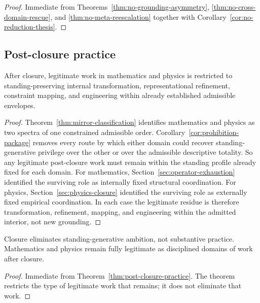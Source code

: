 \begin{proof}
Immediate from Theorems~\ref{thm:no-grounding-asymmetry}, \ref{thm:no-cross-domain-rescue}, and \ref{thm:no-meta-reescalation} together with Corollary~\ref{cor:no-reduction-thesis}.
\end{proof}

\subsection{Post-closure practice}

\begin{theorem}
\label{thm:post-closure-practice}
After closure, legitimate work in mathematics and physics is restricted to standing-preserving internal transformation, representational refinement, constraint mapping, and engineering within already established admissible envelopes.
\end{theorem}

\begin{proof}
Theorem~\ref{thm:mirror-classification} identifies mathematics and physics as two spectra of one constrained admissible order. Corollary~\ref{cor:prohibition-package} removes every route by which either domain could recover standing-generative privilege over the other or over the admissible descriptive totality. So any legitimate post-closure work must remain within the standing profile already fixed for each domain. For mathematics, Section~\ref{sec:operator-exhaustion} identified the surviving role as internally fixed structural coordination. For physics, Section~\ref{sec:physics-closure} identified the surviving role as externally fixed empirical coordination. In each case the legitimate residue is therefore transformation, refinement, mapping, and engineering within the admitted interior, not new grounding.
\end{proof}

\begin{corollary}
\label{cor:not-nihilism}
Closure eliminates standing-generative ambition, not substantive practice. Mathematics and physics remain fully legitimate as disciplined domains of work after closure.
\end{corollary}

\begin{proof}
Immediate from Theorem~\ref{thm:post-closure-practice}. The theorem restricts the type of legitimate work that remains; it does not eliminate that work.
\end{proof}

